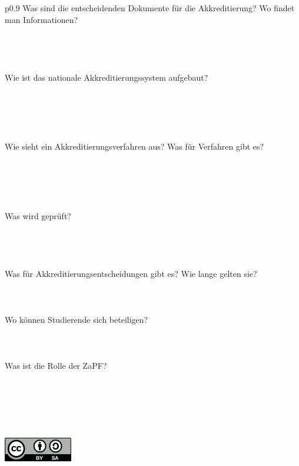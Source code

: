 \documentclass{scrartcl}
\begin{document}
\begin{tabular}{p{0.9\textwidth}}
Was sind die entscheidenden Dokumente für die Akkreditierung? Wo findet man Informationen? \\
\\
\hline\\
\hline\\
\hline\\

Wie ist das nationale Akkreditierungssystem aufgebaut?\\
\\
\\
\\
\\
\\
Wie sieht ein Akkreditierungsverfahren aus? Was für Verfahren gibt es?\\
\\
\\
\\
\\
\\
Was wird geprüft?\\
\\
\hline\\
\hline\\
\hline\\
Was für Akkreditierungsentscheidungen gibt es? Wie lange gelten sie?\\
\\
\hline\\
\hline\\
Wo können Studierende sich beteiligen?\\
\\
\hline\\
\hline\\
Was ist die Rolle der ZaPF?\\
\\
\hline\\
\hline\\
\hline\\

\end{tabular}\\
\hspace*{.8\linewidth}\includegraphics[width=3cm]{CC-BY-SA.png}
\end{document}
